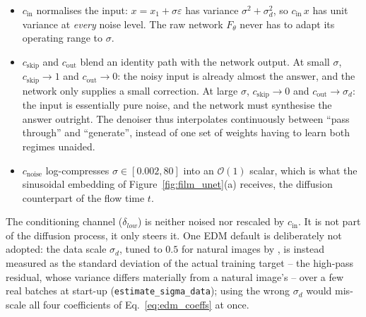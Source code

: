 \documentclass{report}
\begin{document}
\begin{itemize}
  \item \mbox{$c_{\mathrm{in}}$} normalises the input: \mbox{$x = x_1 + \sigma\varepsilon$} has variance \mbox{$\sigma^2 + \sigma_d^2$}, so \mbox{$c_{\mathrm{in}}\,x$} has unit variance at \emph{every} noise level. The raw network \mbox{$F_\theta$} never has to adapt its operating range to \mbox{$\sigma$}.
  \item $c_{\mathrm{skip}}$ and $c_{\mathrm{out}}$ blend an identity path with the network output. At small $\sigma$, $c_{\mathrm{skip}} \to 1$ and $c_{\mathrm{out}} \to 0$: the noisy input is already almost the answer, and the network only supplies a small correction. At large $\sigma$, $c_{\mathrm{skip}} \to 0$ and $c_{\mathrm{out}} \to \sigma_d$: the input is essentially pure noise, and the network must synthesise the answer outright. The denoiser thus interpolates continuously between ``pass through'' and ``generate'', instead of one set of weights having to learn both regimes unaided.
  \item $c_{\mathrm{noise}}$ log-compresses $\sigma \in [0.002, 80]$ into an $\mathcal{O}(1)$ scalar, which is what the sinusoidal embedding of Figure~\ref{fig:film_unet}(a) receives, the diffusion counterpart of the flow time $t$.
\end{itemize}
The conditioning channel ($\delta_{low}$) is neither noised nor rescaled by $c_{\mathrm{in}}$. It is not part of the diffusion process, it only steers it. One EDM default is deliberately not adopted: the data scale $\sigma_d$, tuned to $0.5$ for natural images by \citeauthor{karras_elucidating_2022} \cite{karras_elucidating_2022}, is instead measured as the standard deviation of the actual training target -- the high-pass residual, whose variance differs materially from a natural image's -- over a few real batches at start-up (\texttt{estimate\_sigma\_data}); using the wrong $\sigma_d$ would mis-scale all four coefficients of Eq.~\eqref{eq:edm_coeffs} at once.
\end{document}
